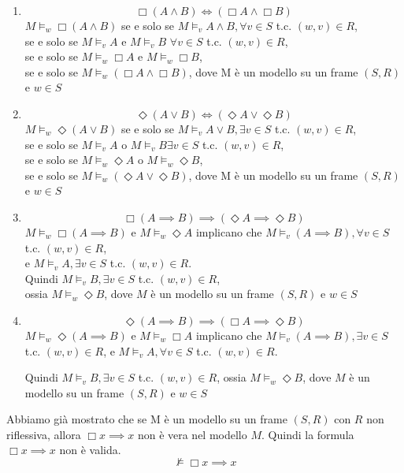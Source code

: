 \documentclass[../main.tex]{subfiles}
\begin{document}
\begin{enumerate}
    \item
          \[
              \Box (A \land B) \iff (\Box A \land \Box B)
          \]
          $M \vDash_w \Box (A \land B)$ se e solo se $M \vDash_v A \land B, \forall v \in S$ t.c. $(w,v) \in R$,\\
          se e solo se $M \vDash_v A$ e $M \vDash_v B$ $\forall v \in S$ t.c. $(w,v) \in R$,\\
          se e solo se $M \vDash_w \Box A$ e $M \vDash_w \Box B$,\\
          se e solo se $M \vDash_w (\Box A \land \Box B)$, dove M è un modello su un frame $(S,R)$ e $w \in S$
    \item
          \[
              \Diamond (A \lor B) \iff (\Diamond A \lor \Diamond B)
          \]
          $M \vDash_w \Diamond (A \lor B)$ se e solo se $M \vDash_v A \lor B, \exists v \in S$ t.c. $(w,v) \in R$,\\
          se e solo se $M \vDash_v A \text{ o } M \vDash_v B \exists v \in S$ t.c. $(w,v) \in R$,\\
          se e solo se $M \vDash_w \Diamond A \text{ o } M \vDash_w \Diamond B$,\\
          se e solo se $M \vDash_w (\Diamond A \lor \Diamond B)$, dove M è un modello su un frame $(S,R)$ e $w \in S$
    \item
          \[
              \Box (A \implies B) \implies (\Diamond A \implies \Diamond B)
          \]
          $M \vDash_w \Box (A \implies B)$ e $M \vDash_w \Diamond A$ implicano che $M \vDash_v (A \implies B), \forall v \in S$ t.c. $(w,v) \in R$,\\
          e $M \vDash_v A, \exists v \in S$ t.c. $(w,v) \in R$.\\
          Quindi $M \vDash_v B, \exists  v \in S$ t.c. $(w,v) \in R$,\\
          ossia $M \vDash_w \Diamond B$, dove $M$ è un modello su un frame $(S,R)$ e $w \in S$
    \item
          \[
              \Diamond (A \implies B) \implies (\Box A \implies \Diamond B)
          \]
          $M \vDash_w \Diamond (A \implies B)$ e $M \vDash_w \Box A$ implicano che $M \vDash_v (A \implies B), \exists v \in S$ t.c. $(w,v) \in R$, e $M \vDash_v A, \forall v \in S$ t.c. $(w,v) \in R$.

          Quindi $M \vDash_v B, \exists v \in S$ t.c. $(w,v) \in R$, ossia $M \vDash_w \Diamond B$, dove $M$ è un modello su un frame $(S,R)$ e $w \in S$
\end{enumerate}
Abbiamo già mostrato che se M è un modello su un frame $(S,R)$ con $R$ non riflessiva, allora $\Box x \implies x$ non è vera nel modello $M$. Quindi la formula $\Box x \implies x$ non è valida.
\begin{equation*}
    \nvDash \Box x \implies x
\end{equation*}
\end{document}
